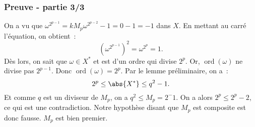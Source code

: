 \documentclass[10pt, mathserif]{beamer}
\DeclareMathOperator{\ord}{ord}
\theoremstyle{definition}
\theoremstyle{remark}
\begin{document}
	\begin{frame}
		\frametitle{Preuve - partie 3/3}

		On a vu que $\omega^{2^{p-1}} = kM_p\omega^{2^{p-2}} - 1 = 0 - 1 = -1$ dans $X$. En mettant au carré l'équation, on obtient~:
		\[\left(\omega^{2^{p-1}}\right)^2 = \omega^{2^p} = 1.\]
		Dès lors, on sait que $\omega \in X^*$ et est d'un ordre qui divise $2^p$. Or, $\ord(\omega)$ ne divise pas $2^{p-1}$. Donc $\ord(\omega) = 2^p$.
		Par le lemme préliminaire, on a~:
		\[2^p \leq \abs {X^*} \leq q^2 - 1.\]
		Et comme $q$ est un diviseur de $M_p$, on a $q^2 \leq M_p = 2^-1$. On a alors $2^p \leq 2^p - 2$, ce qui est une contradiction. Notre hypothèse disant que
		$M_p$ est composite est donc fausse. $M_p$ est bien premier.
	\end{frame}
\end{document}
